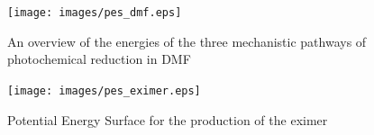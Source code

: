 \begin{landscape}
\begin{figure}[!htbp]
 \begin{center}
  \texttt{[image: images/pes\_dmf.eps]}
 \end{center}
\caption{An overview of the energies of the three mechanistic pathways of photochemical  reduction in DMF}
\label{fig.pes_dmf}
\end{figure} 

\begin{figure}[!htbp]
 \begin{center}
  \texttt{[image: images/pes\_eximer.eps]}
 \end{center}
\caption{Potential Energy Surface for the production of the eximer}
\label{fig.pes_eximer}
\end{figure} 

\end{landscape}